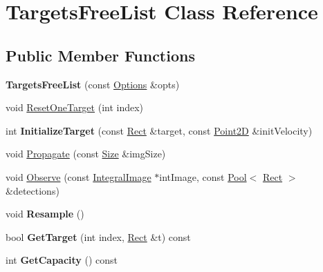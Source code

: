 \hypertarget{classTargetsFreeList}{}\section{Targets\+Free\+List Class Reference}
\label{classTargetsFreeList}
\subsection*{Public Member Functions}
\begin{DoxyCompactItemize}
\item 
\hypertarget{classTargetsFreeList_a09b62a42db80be05c572804054d83125}{}{\bfseries Targets\+Free\+List} (const \hyperlink{structOptions}{Options} \&opts)\label{classTargetsFreeList_a09b62a42db80be05c572804054d83125}

\item 
void \hyperlink{classTargetsFreeList_abfbc250eed26923b56582c862cf1d254}{Reset\+One\+Target} (int index)
\item 
\hypertarget{classTargetsFreeList_aa07866a0019c82181fa866f8cd2bfda9}{}int {\bfseries Initialize\+Target} (const \hyperlink{classRect}{Rect} \&target, const \hyperlink{classPoint2D}{Point2\+D} \&init\+Velocity)\label{classTargetsFreeList_aa07866a0019c82181fa866f8cd2bfda9}

\item 
void \hyperlink{classTargetsFreeList_abd311cfa3633ed0268aab9ae8135deae}{Propagate} (const \hyperlink{classSize}{Size} \&img\+Size)
\item 
void \hyperlink{classTargetsFreeList_a6dbfd6eb0734fa5adc094ebffc6b4926}{Observe} (const \hyperlink{classIntegralImage}{Integral\+Image} $\ast$int\+Image, const \hyperlink{classPool}{Pool}$<$ \hyperlink{classRect}{Rect} $>$ \&detections)
\item 
\hypertarget{classTargetsFreeList_ab78acc51961ee187462aee4f255c1273}{}void {\bfseries Resample} ()\label{classTargetsFreeList_ab78acc51961ee187462aee4f255c1273}

\item 
\hypertarget{classTargetsFreeList_ab3732078a01c7875a4417f951621b3dd}{}bool {\bfseries Get\+Target} (int index, \hyperlink{classRect}{Rect} \&t) const \label{classTargetsFreeList_ab3732078a01c7875a4417f951621b3dd}

\item 
\hypertarget{classTargetsFreeList_ab7627d7885056454812805db6eb69357}{}int {\bfseries Get\+Capacity} () const \label{classTargetsFreeList_ab7627d7885056454812805db6eb69357}


\end{DoxyCompactItemize}
